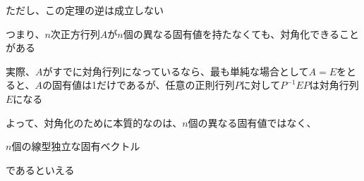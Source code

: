 \documentclass[../../../topic_linear-algebra]{subfiles}
\begin{document}
ただし、この定理の逆は成立しない

つまり、$n$次正方行列$A$が$n$個の異なる固有値を持たなくても、対角化できることがある

\br

実際、$A$がすでに対角行列になっているなら、最も単純な場合として$A = E$をとると、$A$の固有値は1だけであるが、任意の正則行列$P$に対して$P^{-1}EP$は対角行列$E$になる

\br

よって、対角化のために本質的なのは、$n$個の異なる固有値ではなく、
\begin{shaded}
  $n$個の線型独立な固有ベクトル
\end{shaded}
であるといえる
\end{document}
